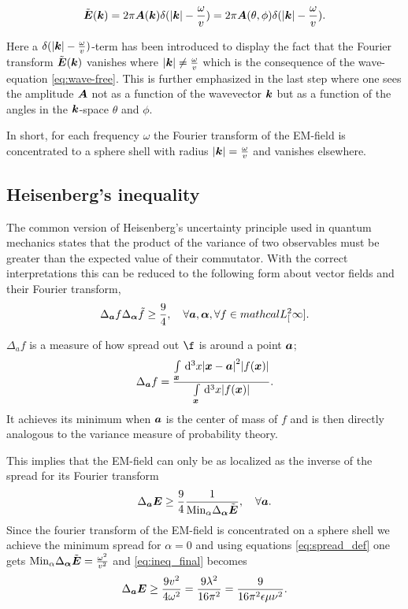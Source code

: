 \documentclass[11pt,a4paper, 
english, swedish %
]{article}
\newcommand{\Lsq}[1]{\ensuremath{mathcal{L}^2_{#1}}}
\begin{document}
\begin{equation}
  \label{eq:f-transf}
  \tilde{\vb*E}(\vb*k)=2\pi\vb*A(\vb*k)\delta(\abs{\vb*k}-\frac{\omega}{v})=2\pi\vb*A(\theta,\phi)\delta(\abs{\vb*k}-\frac{\omega}{v}).
\end{equation}

Here a $\delta(\abs{\vb*k}-\frac{\omega}{v})$-term has been introduced to display the fact that the Fourier transform $\tilde{\vb*E}(\vb*k)$ vanishes where $\abs{\vb*k} \neq\frac{\omega}{v}$ which is the consequence of the wave-equation \ref{eq:wave-free}.
This is further emphasized in the last step where one sees the amplitude $\vb*A$ not as a function of the wavevector $\vb*k$ but as a function of the angles in the $\vb*k$-space $\theta$ and $\phi$.

In short, for each frequency $\omega$ the Fourier transform of the EM-field is concentrated to a sphere shell with radius $\abs{\vb*k}=\frac{\omega}{v}$ and vanishes elsewhere.

\subsection{Heisenberg's inequality}
The common version of Heisenberg's uncertainty principle used in quantum mechanics states that the product of the variance of two observables must be greater than the expected value of their commutator. With the correct interpretations this can be reduced to the following form about vector fields and their Fourier transform, 
\begin{equation}
\Delta_{\vb*a}f \Delta_{\vb*\alpha} \tilde{f} \geq \frac{9}{4}, \quad \forall \vb*a, \vb*\alpha, \forall f \in \Lsq[\infty].
\end{equation}

$\Delta_af$ is a measure of how spread out $\f$ is around a point $\vb*a$;
\begin{equation}
  \label{eq:spread_def}
\Delta_{\vb*a}f=\frac{\int_{\vb*x}\id^3x\abs{\vb*x-\vb*a}^2\abs{f(\vb*x)}}{\int_{\vb*x}\id^3x\abs{f(\vb*x)}}.
\end{equation}
It achieves its minimum when $\vb*a$ is the center of mass of $f$ and is then directly analogous to the variance measure of probability theory.

This implies that the EM-field can only be as localized as the inverse of the spread for its Fourier transform
\begin{equation}
  \label{eq:ineq_final}
  \Delta_{\vb*a}\vb*E\geq \frac{9}{4} \frac{1}{\mathrm{Min}_\alpha\Delta_{\vb*\alpha}\tilde{\vb*E}}, \quad \forall \vb*a.
\end{equation}
Since the fourier transform of the EM-field is concentrated on a sphere shell we achieve the minimum spread for $\alpha=0$ and using equations \ref{eq:spread_def} one gets
$\mathrm{Min}_\alpha\Delta_{\vb*\alpha}\tilde{\vb*E}=\frac{\omega^2}{v^2}$ and \ref{eq:ineq_final} becomes
\begin{equation}
 \Delta_{\vb*a}\vb*E\geq \frac{9v^2}{4\omega^2}=\frac{9\lambda^2}{16\pi^2}=\frac{9}{16\pi^2\epsilon\mu\nu^2}.
 \end{equation}
\end{document}
